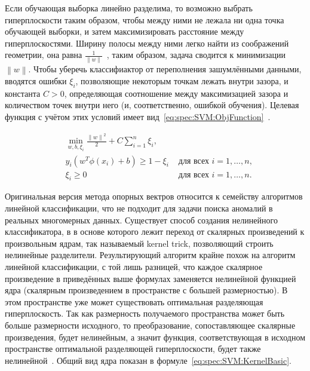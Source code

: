 Если обучающая выборка линейно разделима, то возможно выбрать гиперплоскости таким образом, чтобы между ними не лежала ни одна точка обучающей выборки, и затем максимизировать расстояние между гиперплоскостями. Ширину полосы между ними легко найти из соображений геометрии, она равна $\frac{1}{\left\|w\right\|}$~\cite{VorontsovMachineLearning}, таким образом, задача сводится к минимизации $\left\|w\right\|$. Чтобы уберечь классифиактор от переполнения зашумлёнными данными, вводятся ошибки $\xi_i$, позволяющие некоторым точкам лежать внутри зазора, и константа $C > 0$, определяющая соотношение между максимизацией зазора и количеством точек внутри него (и, соответственно, ошибкой обучения). Целевая функция с учётом этих условий имеет вид~\eqref{eq:spec:SVM:ObjFunction}~\cite{RoemerIntroToOneClassSVM}.

\begin{equation} \label{eq:spec:SVM:ObjFunction}
\begin{aligned}
&\min_{w,b,\xi_i} \frac{{\left\|w\right\|}^2}{2} + C \sum_{i=1}^{n} \xi_i \text{,} \\
&y_i(w^T \phi(x_i) + b) \geq 1 - \xi_i &\text{ для всех } i = 1,\dots,n \text{,} \\
&\xi_i \geq 0 &\text{ для всех } i = 1,\dots,n \text{.}
\end{aligned}
\end{equation}

Оригинальная версия метода опорных вектров относится к семейству алгоритмов линейной классификации, что не подходит для задачи поиска аномалий в реальных многомерных данных. Существует способ создания нелинейного классификатора, в в основе которого лежит переход от скалярных произведений к произвольным ядрам, так называемый kernel trick, позволяющий строить нелинейные разделители. Результирующий алгоритм крайне похож на алгоритм линейной классификации, с той лишь разницей, что каждое скалярное произведение в приведённых выше формулах заменяется нелинейной функцией ядра (скалярным произведением в пространстве с большей размерностью). В этом пространстве уже может существовать оптимальная разделяющая гиперплоскость. Так как размерность получаемого пространства может быть больше размерности исходного, то преобразование, сопоставляющее скалярные произведения, будет нелинейным, а значит функция, соответствующая в исходном пространстве оптимальной разделяющей гиперплоскости, будет также нелинейной~\cite{LifshitsInternetAlgorithms}. Общий вид ядра показан в формуле~\eqref{eq:spec:SVM:KernelBasic}.

